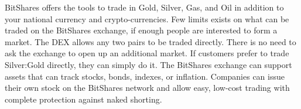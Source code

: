 BitShares offers the tools to trade in Gold, Silver, Gas, and Oil in addition
to your national currency and crypto-currencies. Few limits exists on what can
be traded on the BitShares exchange, if enough people are interested to form a
market. The DEX allows any two pairs to be traded directly. There is no need to
ask the exchange to open up an additional market. If customers prefer to trade
Silver:Gold directly, they can simply do it. The BitShares exchange can support
assets that can track stocks, bonds, indexes, or inflation. Companies can issue
their own stock on the BitShares network and allow easy, low-cost trading with
complete protection against naked shorting.
